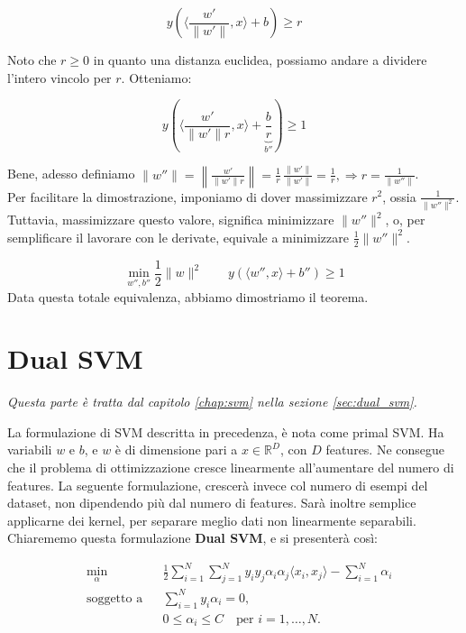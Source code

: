 $$
y \left(\Big\langle \frac{w'}{\|w'\|}, x\Big\rangle + b\right) \geq r
$$

Noto che $r \geq 0$ in quanto una distanza euclidea, possiamo andare a dividere l'intero vincolo per $r$. Otteniamo:

$$
y \left(\Big\langle \frac{w'}{\|w'\|r}, x\Big\rangle + \underbrace{\frac{b}{r}}_{b''} \right) \geq 1
$$

Bene, adesso definiamo $\displaystyle \|w''\|
= \left\|\frac{w'}{\|w'\| r}\right\|
= \frac{1}{r}\,\frac{\|w'\|}{\|w'\|}
= \frac{1}{r}, \Rightarrow r = \frac{1}{\| w''\|}$. \\
Per facilitare la dimostrazione, imponiamo di dover massimizzare $r^2$, ossia  $\displaystyle\frac{1}{\|w''\|^2}$. Tuttavia, massimizzare questo valore, significa minimizzare  $\|w''\|^2$, o, per semplificare il lavorare con le derivate, equivale a minimizzare $\displaystyle\frac{1}{2} \|w''\|^2$.


$$
\min_{w'',b''} \frac12\|w\|^2 \qquad y (\langle w'', x\rangle + b'') \geq 1
$$
Data questa totale equivalenza, abbiamo dimostriamo il teorema.


\section{Dual SVM}\label{sec:dual_svm_approfondimento}

\textit{Questa parte è tratta dal capitolo \ref{chap:svm} nella sezione \ref{sec:dual_svm}.}

\bigskip
\noindent
La formulazione di SVM descritta in precedenza, è nota come primal SVM. Ha variabili $w$ e $b$, e $w$ è di dimensione pari a $x \in \mathbb{R}^D$, con $D$ features. Ne consegue che il problema di ottimizzazione cresce linearmente all'aumentare del numero di features. La seguente formulazione, crescerà invece col numero di esempi del dataset, non dipendendo più dal numero di features. Sarà inoltre semplice applicarne dei kernel, per separare meglio dati non linearmente separabili. Chiarememo questa formulazione \textbf{Dual SVM}, e si presenterà così:

$$
\begin{aligned}
	&\min_{\alpha} && 
	\frac{1}{2} \sum_{i=1}^{N} \sum_{j=1}^{N} 
	y_i y_j \alpha_i \alpha_j \langle x_i, x_j \rangle
	- \sum_{i=1}^{N} \alpha_i \\
	&\text{soggetto a} && 
	\sum_{i=1}^{N} y_i \alpha_i = 0, \\
	& && 0 \le \alpha_i \le C \quad \text{per } i = 1,\dots, N .
\end{aligned}
$$

